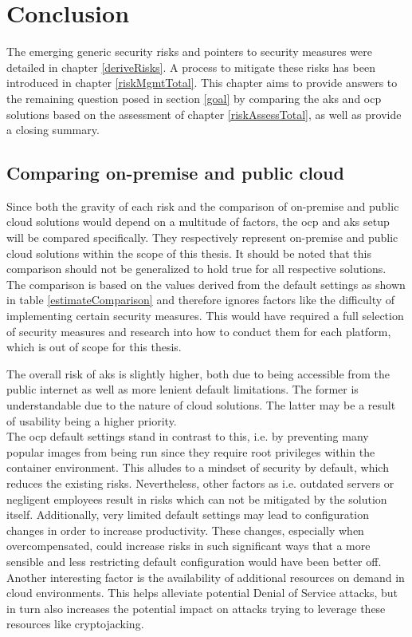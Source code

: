 \chapter{Conclusion}
The emerging generic security risks and pointers to security measures were detailed in chapter \ref{deriveRisks}. A process to mitigate these risks has been introduced in chapter \ref{riskMgmtTotal}. 
This chapter aims to provide answers to the remaining question posed in section \ref{goal} by comparing the \gls{aks} and \gls{ocp} solutions based on the assessment of chapter \ref{riskAssessTotal}, as well as provide a closing summary.

\section{Comparing on-premise and public cloud}

Since both the gravity of each risk and the comparison of on-premise and public cloud solutions would depend on a multitude of factors, the \gls{ocp} and \gls{aks} setup will be compared specifically. They respectively represent on-premise and public cloud solutions within the scope of this thesis. It should be noted that this comparison should not be generalized to hold true for all respective solutions.
The comparison is based on the values derived from the default settings as shown in table \ref{estimateComparison} and therefore ignores factors like the difficulty of implementing certain security measures. This would have required a full selection of security measures and research into how to conduct them for each platform, which is out of scope for this thesis.


The overall risk of \gls{aks} is slightly higher, both due to being accessible from the public internet as well as more lenient default limitations. The former is understandable due to the nature of cloud solutions. The latter may be a result of usability being a higher priority. \\
The \gls{ocp} default settings stand in contrast to this, i.e. by preventing many popular images from being run since they require root privileges within the container environment. This alludes to a mindset of security by default, which reduces the existing risks. Nevertheless, other factors as i.e. outdated servers or negligent employees result in risks which can not be mitigated by the solution itself.
Additionally, very limited default settings may lead to configuration changes in order to increase productivity. These changes, especially when overcompensated, could increase risks in such significant ways that a more sensible and less restricting default configuration would have been better off.
Another interesting factor is the availability of additional resources on demand in cloud environments. This helps alleviate potential Denial of Service attacks, but in turn also increases the potential impact on attacks trying to leverage these resources like cryptojacking.

